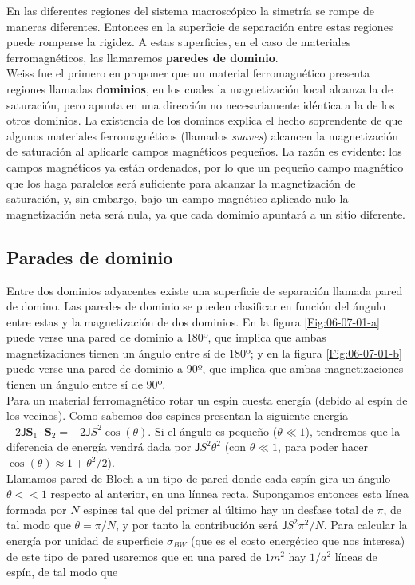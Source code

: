 \documentclass[12pt,a4paper]{book}
\numberwithin{equation}{section}
\numberwithin{figure}{section}
\newcommand{\Jsf}{\mathsf{J}}
\newcommand{\Sn}{\mathbf{S}}
\begin{document}
En las diferentes regiones del sistema macroscópico la simetría se rompe de maneras diferentes. Entonces en la superficie de separación entre estas regiones puede romperse la rigidez. A estas superficies, en el caso de materiales ferromagnéticos, las llamaremos \textbf{paredes de dominio}. \\

Weiss fue el primero en proponer que un material ferromagnético presenta regiones llamadas \textbf{dominios}, en los cuales la magnetización local alcanza la de saturación, pero apunta en una dirección no necesariamente idéntica a la de los otros dominios. La existencia de los dominos explica el hecho soprendente de que algunos materiales ferromagnéticos (llamados \textit{suaves}) alcancen la magnetización de saturación al aplicarle campos magnéticos pequeños. La razón es evidente: los campos magnéticos ya están ordenados, por lo que un pequeño campo magnético que los haga paralelos será suficiente para alcanzar la magnetización de saturación, y, sin embargo, bajo un campo magnético aplicado nulo la magnetización neta será nula, ya que cada domimio apuntará a un sitio diferente. 


\subsection{Parades de dominio}

Entre dos dominios adyacentes existe una superficie de separación llamada pared de domino. Las paredes de dominio se pueden clasificar en función del ángulo entre estas y la magnetización de dos dominios. En la figura \ref{Fig:06-07-01-a} puede verse una pared de dominio a 180º, que implica que ambas magnetizaciones tienen un ángulo entre sí de 180º; y en la figura \ref{Fig:06-07-01-b} puede verse una pared de dominio a 90º, que implica que ambas magnetizaciones tienen un ángulo entre sí de 90º. \\

Para un material ferromagnético rotar un espin cuesta energía (debido al espín de los vecinos). Como sabemos dos espines presentan la siguiente energía $-2\Jsf \Sn_1\cdot \Sn_2=-2\Jsf S^2 \cos (\theta)$. Si el ángulo es pequeño ($\theta \ll 1$), tendremos que la diferencia de energía vendrá dada por $\Jsf S^2 \theta^2$ (con $\theta \ll 1$, para poder hacer $\cos (\theta) \approx 1 + \theta^2/2$). \\

Llamamos pared de Bloch a un tipo de pared donde cada espín gira un ángulo $\theta<<1$ respecto al anterior, en una línnea recta. Supongamos entonces esta línea formada por $N$ espines tal que del primer al último hay un desfase total de $\pi$, de tal modo que $\theta = \pi /N$, y por tanto la contribución será $\Jsf S^2 \pi^2/N$. Para calcular la energía por unidad de superficie $\sigma_{BW}$ (que es el costo energético que nos interesa) de este tipo de pared usaremos que en una pared de $1m^2$ hay $1/a^2$ líneas de espín, de tal modo que
\end{document}
